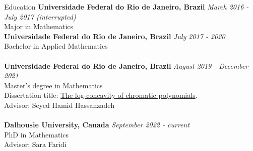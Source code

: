 \documentclass[12pt]{resume} %
\begin{document}

\begin{rSection}{Education}
{\bf Universidade Federal do Rio de Janeiro, Brazil} \hfill {\em March 2016 - July 2017 (interrupted)} 
\\ Major in Mathematics\\
{\bf Universidade Federal do Rio de Janeiro, Brazil} \hfill {\em July 2017 - 2020} 
\\ Bachelor in Applied Mathematics
\\
\\{\bf Universidade Federal do Rio de Janeiro, Brazil} \hfill {\em August 2019 - December 2021} 
\\ Master's degree in Mathematics
\\ Dissertation title: \href{https://hollebenthiago.github.io/msc/main.pdf}{The log-concavity of chromatic polynomials}.
\\ Advisor: Seyed Hamid Hassanzadeh
\\
\\{\bf Dalhousie University, Canada} \hfill {\em September 2022 - current} 
\\ PhD in Mathematics
\\ Advisor: Sara Faridi

\end{rSection}



\end{document}
